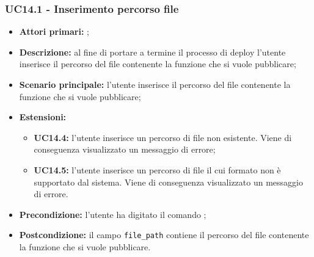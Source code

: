 \subsubsection{UC14.1 - Inserimento percorso file}
\begin{itemize}
	\item \textbf{Attori primari:} \us{};
	\item \textbf{Descrizione:} al fine di portare a termine il processo di deploy l’utente inserisce il percorso del file contenente la funzione che si vuole pubblicare;  
	\item \textbf{Scenario principale:} l'utente inserisce il percorso del file contenente la funzione che si vuole pubblicare; 
	\item \textbf{Estensioni:} 
	\begin{itemize}
		\item \textbf{UC14.4:} l’utente inserisce un percorso di file non esistente. Viene di conseguenza visualizzato un messaggio di errore;
		\item \textbf{UC14.5:} l’utente inserisce un percorso di file il cui formato non è supportato dal sistema. Viene di conseguenza visualizzato un messaggio di errore. 
	\end{itemize}
	\item \textbf{Precondizione:} l’utente ha digitato il comando \deploy{}; 
	\item \textbf{Postcondizione:} il campo \texttt{file\_path} contiene il percorso del file contenente la funzione che si vuole pubblicare. 
\end{itemize}